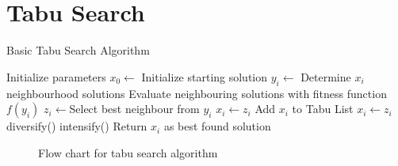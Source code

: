 \section{Tabu Search}
\label{sec:tabusearch}
\begin{algorithm}
\caption{Basic Tabu Search Algorithm\cite{TabuRCAProblem,TabuMontemanniSmith}}
\label{alg:TS}
	\begin{algorithmic}[1]
		\STATE Initialize parameters
		\STATE $x_0 \leftarrow$ Initialize starting solution
			\STATE $y_i \leftarrow$ Determine $x_i$ neighbourhood solutions 
			\STATE Evaluate neighbouring solutions with fitness function $f(y_i)$
			\STATE $z_i \leftarrow$Select best neighbour from $y_i$
					\STATE $x_i \leftarrow z_i$
				\ENDIF
			\ELSE
				\STATE Add $x_i$ to Tabu List
				\STATE $x_i \leftarrow z_i$
					\STATE diversify()
				\ELSE
					\STATE intensify()
				\ENDIF
			\ENDIF
		\ENDWHILE
		\STATE Return $x_i$ as best found solution
	\end{algorithmic}
\end{algorithm}
\begin{figure}[p!]
	\begin{center}
	\caption{Flow chart for tabu search algorithm}
	\label{fig:TSAlgorithmFlowChart}
	\end{center}
\end{figure}
